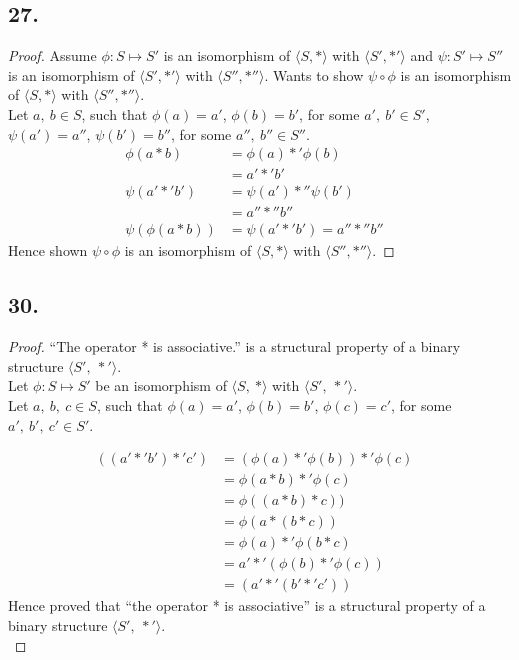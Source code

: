 \documentclass{article}
\begin{document}
\subsection*{27.}
	\begin{proof} Assume $\phi:S\mapsto S'$ is an isomorphism of $\langle S, *\rangle$
		with $\langle S', *'\rangle$ and $\psi:S'\mapsto S''$ is an isomorphism of
		$\langle S', *'\rangle$ with $\langle S'', *''\rangle$. Wants to show 
		$\psi \circ \phi$ is an isomorphism of $\langle S, *\rangle$ with $\langle
		S'', *''\rangle$.\\
		Let $a,\ b \in S$, such that $\phi(a)=a'$, $\phi(b)=b'$, for some
		$a',\ b' \in S'$, $\psi(a') = a''$, $\psi(b')=b''$, for some
		$a'',\ b'' \in S''$.
		\begin{align*}
			\phi(a*b) &= \phi(a) *' \phi(b) &\\
								&= a' *' b' &\\
			\psi(a'*' b') &= \psi(a') *'' \psi(b') &\\
										&= a'' *'' b'' &\\
			\psi(\phi(a*b)) &= \psi(a'*' b') = a'' *'' b''&
		\end{align*}
		Hence shown $\psi \circ \phi$ is an isomorphism of $\langle S, *\rangle$ with $\langle
		S'', *''\rangle$.
	\end{proof}

\subsection*{30.}
\begin{proof} ``The operator * is associative.'' is a structural property of a
	binary structure $\langle S',\ *'\rangle$.\\
	Let $\phi: S \mapsto S'$ be an isomorphism of $\langle S,\ *\rangle$ with $\langle S',\
	*'\rangle$.\\
	Let $a,\ b,\ c \in S$, such that $\phi(a)=a'$, $\phi(b)=b'$, $\phi(c)=c'$, for some
	$a',\ b',\ c' \in S'$.

	\begin{align*}
		((a' *' b') *' c') &= (\phi(a) *' \phi(b)) *' \phi(c) &\\
											 &= \phi(a*b) *' \phi(c)&\\
											 &= \phi((a * b) * c))&\\
											 &= \phi(a*(b*c))&\\
											 &= \phi(a) *' \phi(b*c)&\\
											 &= a' *' (\phi(b)*'\phi(c))&\\
											 &= (a' *' (b'*' c'))&
	\end{align*}
	Hence proved that ``the operator * is associative'' is a structural property of a
	binary structure $\langle S',\ *'\rangle$.\\
\end{proof}
\end{document}
